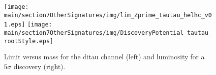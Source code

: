 \begin{figure}[htbp]
  \centering
    \texttt{[image: \\main/section7OtherSignatures/img/lim\_Zprime\_tautau\_helhc\_v01.eps]}
    \texttt{[image: \\main/section7OtherSignatures/img/DiscoveryPotential\_tautau\_rootStyle.eps]}
  \caption{Limit versus mass for the ditau channel (left) and luminosity for a $5\sigma$ discovery (right). }
  \label{fig:leptonicresonances:resultstautau}
\end{figure}
